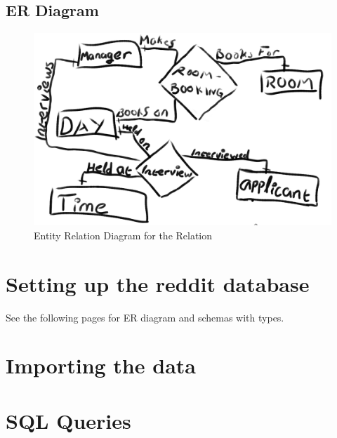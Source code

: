 \documentclass[12pt]{article}
\begin{document}
\subsection {ER Diagram}\label{subsec:er-diagram}
\begin {figure}[h]
\includegraphics[width=\textwidth]{ER}
\caption {Entity Relation Diagram for the Relation}\label{fig:figure2}
\end {figure}

\section {Setting up the reddit database}\label{sec:setting-up-the-reddit-database}

See the following pages for ER diagram and schemas with types.



\section {Importing the data}\label{sec:importing-the-data}


\section {SQL Queries}\label{sec:sql-queries}

\end{document}
